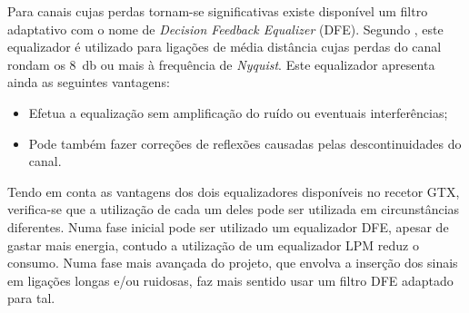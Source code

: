 Para canais cujas perdas tornam-se significativas existe disponível um filtro adaptativo com o nome de \textit{Decision Feedback Equalizer} (DFE). 
Segundo \cite{R011}, este equalizador é utilizado para ligações de média distância cujas perdas do canal rondam os \SI{8}{\decibel} ou mais à frequência de \textit{Nyquist}. Este equalizador apresenta ainda as seguintes vantagens:
\begin{itemize}
	\item Efetua a equalização sem amplificação do ruído ou eventuais interferências;
	\item Pode também fazer correções de reflexões causadas pelas descontinuidades do canal.
\end{itemize}


Tendo em conta as vantagens dos dois equalizadores disponíveis no recetor GTX, verifica-se que a utilização de cada um deles pode ser utilizada em circunstâncias diferentes. Numa fase inicial pode ser utilizado um equalizador DFE, apesar de gastar mais energia, contudo a utilização de um equalizador LPM reduz o consumo. Numa fase mais avançada do projeto, que envolva a inserção dos sinais em ligações longas e/ou ruidosas, faz mais sentido usar um filtro DFE adaptado para tal. 



%

